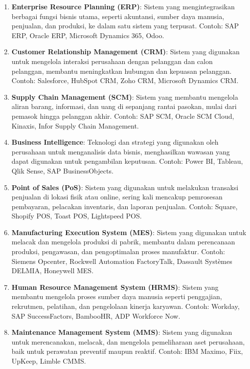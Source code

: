 \begin{enumerate}
	\item \textbf{Enterprise Resource Planning (ERP)}: Sistem yang mengintegrasikan berbagai fungsi bisnis utama, seperti akuntansi, sumber daya manusia, penjualan, dan produksi, ke dalam satu sistem yang terpusat. Contoh: SAP ERP, Oracle ERP, Microsoft Dynamics 365, Odoo.
	
	\item \textbf{Customer Relationship Management (CRM)}: Sistem yang digunakan untuk mengelola interaksi perusahaan dengan pelanggan dan calon pelanggan, membantu meningkatkan hubungan dan kepuasan pelanggan. Contoh: Salesforce, HubSpot CRM, Zoho CRM, Microsoft Dynamics CRM.
	
	\item \textbf{Supply Chain Management (SCM)}: Sistem yang membantu mengelola aliran barang, informasi, dan uang di sepanjang rantai pasokan, mulai dari pemasok hingga pelanggan akhir. Contoh: SAP SCM, Oracle SCM Cloud, Kinaxis, Infor Supply Chain Management.
	
	\item \textbf{Business Intelligence}: Teknologi dan strategi yang digunakan oleh perusahaan untuk menganalisis data bisnis, menghasilkan wawasan yang dapat digunakan untuk pengambilan keputusan. Contoh: Power BI, Tableau, Qlik Sense, SAP BusinessObjects.
	
	\item \textbf{Point of Sales (PoS)}: Sistem yang digunakan untuk melakukan transaksi penjualan di lokasi fisik atau online, sering kali mencakup pemrosesan pembayaran, pelacakan inventaris, dan laporan penjualan. Contoh: Square, Shopify POS, Toast POS, Lightspeed POS.
	
	\item \textbf{Manufacturing Execution System (MES)}: Sistem yang digunakan untuk melacak dan mengelola produksi di pabrik, membantu dalam perencanaan produksi, pengawasan, dan pengoptimalan proses manufaktur. Contoh: Siemens Opcenter, Rockwell Automation FactoryTalk, Dassault Systèmes DELMIA, Honeywell MES.
	
	\item \textbf{Human Resource Management System (HRMS)}: Sistem yang membantu mengelola proses sumber daya manusia seperti penggajian, rekrutmen, pelatihan, dan pengelolaan kinerja karyawan. Contoh: Workday, SAP SuccessFactors, BambooHR, ADP Workforce Now.
	
	\item \textbf{Maintenance Management System (MMS)}: Sistem yang digunakan untuk merencanakan, melacak, dan mengelola pemeliharaan aset perusahaan, baik untuk perawatan preventif maupun reaktif. Contoh: IBM Maximo, Fiix, UpKeep, Limble CMMS.
	

\end{enumerate}
